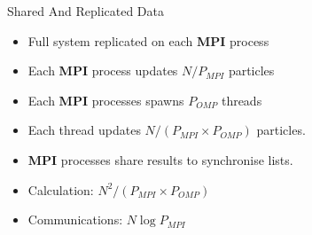 \documentclass[xcolor={usenames, svgnames}]{beamer}
\begin{document}
\begin{frame}{Shared And Replicated Data}
    \rdpic{}

    \begin{itemize}
        \item Full system replicated on each {\bf MPI} process
        \item Each {\bf MPI} process updates $N/P_{MPI}$ particles
        \item Each {\bf MPI} processes spawns $P_{OMP}$ {\bf \openmp} threads
        \item Each {\bf \openmp{}} thread updates
            $N/(P_{MPI}\times{}P_{OMP})$ particles.
        \item {\bf MPI} processes share results to synchronise lists.
        \item Calculation: $N^2/(P_{MPI}\times{}P_{OMP})$
        \item Communications: $N\log{P_{MPI}}$
    \end{itemize}
\end{frame}


\newcommand{\slpic}{
    \begin{tikzpicture}
        \draw [draw, rounded corners] (-0.5,0) rectangle +(2, 1);
        \draw [draw, rounded corners] (2,1.5) rectangle +(1, 2);
        \draw [draw, rounded corners] (4,1.5) rectangle +(1, 2);
        \draw [draw, rounded corners] (5.5,0) rectangle +(2, 1);
        \draw [draw, rounded corners] (4,-0.5) rectangle +(1, -2);
        \draw [draw, rounded corners] (2,-0.5) rectangle +(1, -2);
        \foreach \xy in {
            {(-0.5,0)},
            {(2,2.5)}, {(4,2.5)},
            {(6.5,0)},
            {(4,-2.5)}, {(2,-2.5)}
        } {
            \draw [block, bluefill]
                {\xy+(0.1,0.1)} rectangle +(0.9, 0.9);
        }
        \foreach \xy in {
            {(0.5,0)},
            {(2,1.5)}, {(4,1.5)},
            {(5.5,0)},
            {(4,-1.5)}, {(2,-1.5)}
        } {
            \draw [block, redfill]
                {\xy+(0.1,0.1)} rectangle +(0.9, 0.9);
        }
        \newcommand{\off}{0.1}
        \path [line] (1, 0.5+\off) |- +(1.5, 1.5-\off);
        \path [line] (2.5+\off, 2) -- +(2-\off, 0);
        \path [line] (4.5+\off, 2) -| +(1.5-\off, -1.5);
        \path [line] (6, 0.5-\off) |- +(-1.5, -1.5+\off);
        \path [line] (4.5-\off, -1) -- +(-2+\off, 0);
        \path [line] (2.5-\off, -1) -| +(-1.5+\off, +1.5);
        \foreach \xy/\n in {
            {(-1,0.5)}/0,
            {(2.5,4)}/1, {(4.5,4)}/2,
            {(8,0.5)}/3,
            {(4.5,-3)}/4, {(2.5,-3)}/5
        } {
            \node at \xy {\n};
        }
    \end{tikzpicture}
}
\end{document}
